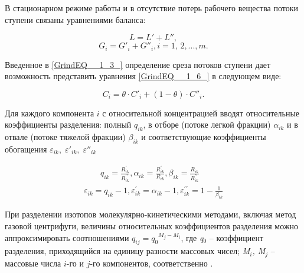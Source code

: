 В стационарном режиме работы и в отсутствие потерь рабочего вещества потоки ступени связаны уравнениями баланса:

\begin{equation} \label{GrindEQ__1_5_} 
  L=L'+L'', 
  \end{equation} 
  \begin{equation} \label{GrindEQ__1_6_} 
  G_{i} =G'_{i} + G''_{i} , i=1,\, 2,...,m.             
\end{equation} 
  
Введенное в \ref{GrindEQ__1_3_} определение среза потоков ступени дает возможность представить уравнения \ref{GrindEQ__1_6_} в следующем виде:

\begin{equation} \label{GrindEQ__1_7_} 
  C_{i} =\theta  \cdot C'_{i} +(1-\theta ) \cdot C''_{i} . 
\end{equation} 

Для каждого компонента $i$ с относительной концентрацией вводят относительные коэффициенты разделения: полный $q_{ik}$, в отборе (потоке легкой фракции) $\alpha _{ik} $ и в отвале (потоке тяжелой фракции) $\beta _{ik} $ и соответствующие коэффициенты обогащения $\varepsilon _{ik} ,\; \varepsilon '_{ik} ,\; \varepsilon ''_{ik} \; $

\begin{equation} \label{GrindEQ__1_11_} 
  \begin{array}{l}
    \qquad q_{i k}=\frac{R_{i k}^{\prime}}{R_{i k}^{\prime \prime}}, \alpha_{i k}=\frac{R_{i k}^{\prime}}{R_{i k}}, \beta_{i k}=\frac{R_{i k}}{R_{i k}^{\prime \prime}} \\
    \varepsilon_{i k}=q_{i k}-1, \varepsilon_{i k}^{\prime}=\alpha_{i k}-1, \varepsilon_{i k}^{\prime \prime}=1-\frac{1}{\beta_{i k}}
    \end{array}
\end{equation} 

При разделении изотопов молекулярно-кинетическими методами, включая метод газовой центрифуги, величины относительных коэффициентов разделения можно аппроксимировать соотношениями $q_{ij} =q_{0} {}^{M_{j} -M_{i} }$, где \textit{q}${}_{0}$ -- коэффициент разделения, приходящийся на единицу разности массовых чисел; \textit{M${}_{i}$, M${}_{j}$} – массовые числа $i$-го и $j$-го компонентов, соответственно \cite{sulaberidzeTeoriyaKaskadovDlya2011}.

